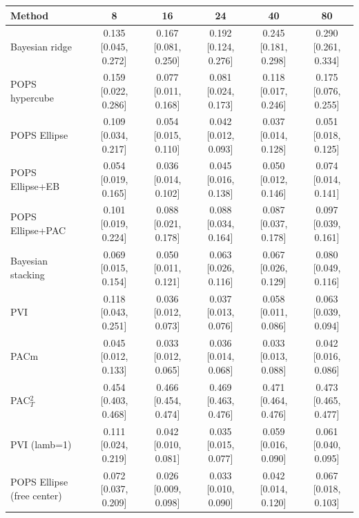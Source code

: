\begin{tabular}{lccccc}
\toprule
Method & 8 & 16 & 24 & 40 & 80 \\
\midrule
Bayesian ridge & 0.135 {\scriptsize[0.045, 0.272]} & 0.167 {\scriptsize[0.081, 0.250]} & 0.192 {\scriptsize[0.124, 0.276]} & 0.245 {\scriptsize[0.181, 0.298]} & 0.290 {\scriptsize[0.261, 0.334]} \\
POPS hypercube & 0.159 {\scriptsize[0.022, 0.286]} & 0.077 {\scriptsize[0.011, 0.168]} & 0.081 {\scriptsize[0.024, 0.173]} & 0.118 {\scriptsize[0.017, 0.246]} & 0.175 {\scriptsize[0.076, 0.255]} \\
POPS Ellipse & 0.109 {\scriptsize[0.034, 0.217]} & 0.054 {\scriptsize[0.015, 0.110]} & 0.042 {\scriptsize[0.012, 0.093]} & 0.037 {\scriptsize[0.014, 0.128]} & 0.051 {\scriptsize[0.018, 0.125]} \\
POPS Ellipse+EB & 0.054 {\scriptsize[0.019, 0.165]} & 0.036 {\scriptsize[0.014, 0.102]} & 0.045 {\scriptsize[0.016, 0.138]} & 0.050 {\scriptsize[0.012, 0.146]} & 0.074 {\scriptsize[0.014, 0.141]} \\
POPS Ellipse+PAC & 0.101 {\scriptsize[0.019, 0.224]} & 0.088 {\scriptsize[0.021, 0.178]} & 0.088 {\scriptsize[0.034, 0.164]} & 0.087 {\scriptsize[0.037, 0.178]} & 0.097 {\scriptsize[0.039, 0.161]} \\
Bayesian stacking & 0.069 {\scriptsize[0.015, 0.154]} & 0.050 {\scriptsize[0.011, 0.121]} & 0.063 {\scriptsize[0.026, 0.116]} & 0.067 {\scriptsize[0.026, 0.129]} & 0.080 {\scriptsize[0.049, 0.116]} \\
PVI & 0.118 {\scriptsize[0.043, 0.251]} & 0.036 {\scriptsize[0.012, 0.073]} & 0.037 {\scriptsize[0.013, 0.076]} & 0.058 {\scriptsize[0.011, 0.086]} & 0.063 {\scriptsize[0.039, 0.094]} \\
PACm & 0.045 {\scriptsize[0.012, 0.133]} & 0.033 {\scriptsize[0.012, 0.065]} & 0.036 {\scriptsize[0.014, 0.068]} & 0.033 {\scriptsize[0.013, 0.088]} & 0.042 {\scriptsize[0.016, 0.086]} \\
PAC$^2_T$ & 0.454 {\scriptsize[0.403, 0.468]} & 0.466 {\scriptsize[0.454, 0.474]} & 0.469 {\scriptsize[0.463, 0.476]} & 0.471 {\scriptsize[0.464, 0.476]} & 0.473 {\scriptsize[0.465, 0.477]} \\
PVI (lamb=1) & 0.111 {\scriptsize[0.024, 0.219]} & 0.042 {\scriptsize[0.010, 0.081]} & 0.035 {\scriptsize[0.015, 0.077]} & 0.059 {\scriptsize[0.016, 0.090]} & 0.061 {\scriptsize[0.040, 0.095]} \\
POPS Ellipse (free center) & 0.072 {\scriptsize[0.037, 0.209]} & 0.026 {\scriptsize[0.009, 0.098]} & 0.033 {\scriptsize[0.010, 0.090]} & 0.042 {\scriptsize[0.014, 0.120]} & 0.067 {\scriptsize[0.018, 0.103]} \\

\end{tabular}
